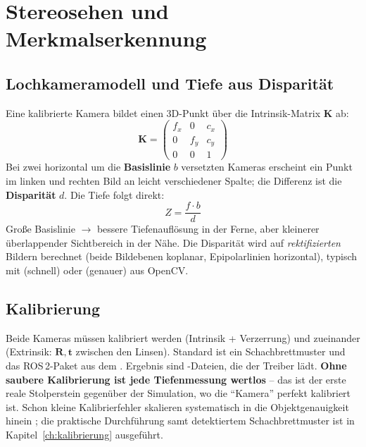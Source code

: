 
\chapter{Stereosehen und Merkmalserkennung}
\label{ch:stereosehen}

\section{Lochkameramodell und Tiefe aus Disparität}
Eine kalibrierte Kamera bildet einen 3D-Punkt über die Intrinsik-Matrix $\bm{K}$
ab:
\begin{equation}
\bm{K} = \begin{pmatrix} f_x & 0 & c_x \\ 0 & f_y & c_y \\ 0 & 0 & 1 \end{pmatrix}
\end{equation}
Bei zwei horizontal um die \textbf{Basislinie} $b$ versetzten Kameras erscheint
ein Punkt im linken und rechten Bild an leicht verschiedener Spalte; die
Differenz ist die \textbf{Disparität} $d$. Die Tiefe folgt direkt:
\begin{equation}
\boxed{\,Z = \dfrac{f\cdot b}{d}\,}
\end{equation}
Große Basislinie $\rightarrow$ bessere Tiefenauflösung in der Ferne, aber
kleinerer überlappender Sichtbereich in der Nähe. Die Disparität wird auf
\emph{rektifizierten} Bildern berechnet (beide Bildebenen koplanar,
Epipolarlinien horizontal), typisch mit  (schnell) oder
 (genauer) aus OpenCV.

\section{Kalibrierung}
Beide Kameras müssen kalibriert werden (Intrinsik + Verzerrung) und zueinander
(Extrinsik: $\bm{R},\bm{t}$ zwischen den Linsen). Standard ist ein
Schachbrettmuster \cite{opencv_calib} und das ROS\,2-Paket
 aus dem
. Ergebnis sind -Dateien, die der Treiber
lädt. \textbf{Ohne saubere Kalibrierung ist jede Tiefenmessung wertlos} -- das
ist der erste reale Stolperstein gegenüber der Simulation, wo die ``Kamera''
perfekt kalibriert ist. Schon kleine Kalibrierfehler skalieren systematisch in
die Objektgenauigkeit hinein \cite{kahmen2020stereocalib}; die praktische
Durchführung samt detektiertem Schachbrettmuster ist in
Kapitel~\ref{ch:kalibrierung} ausgeführt.

